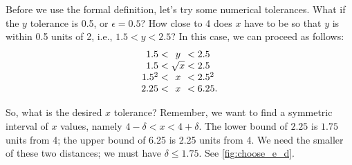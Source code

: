{Before we use the formal definition, let's try some numerical tolerances.  What if the $y$ tolerance is 0.5, or $\epsilon =0.5$?  How close to 4 does $x$ have to be so that $y$ is within 0.5 units of 2, i.e., $1.5 < y < 2.5$?  In this case, we can proceed as follows:
\[\setlength{\arraycolsep}{0pt}
\begin{array}{rcl}
1.5 < {} & y & {} < 2.5 \\
1.5 <{} & \sqrt{x} & {}< 2.5\\
1.5^2 < {} & x & {} < 2.5^2\\
2.25 < {} & x & {} < 6.25.
\end{array}\]

So, what is the desired $x$ tolerance?  Remember, we want to find a symmetric interval of $x$ values, namely
$4 - \delta < x < 4 + \delta$.  The lower bound of $2.25$ is $1.75$ units from 4; the upper bound of 6.25 is 2.25 units from 4. We need the smaller of these two distances; we must have $\delta \leq 1.75$. See \autoref{fig:choose_e_d}.\bigskip

}
